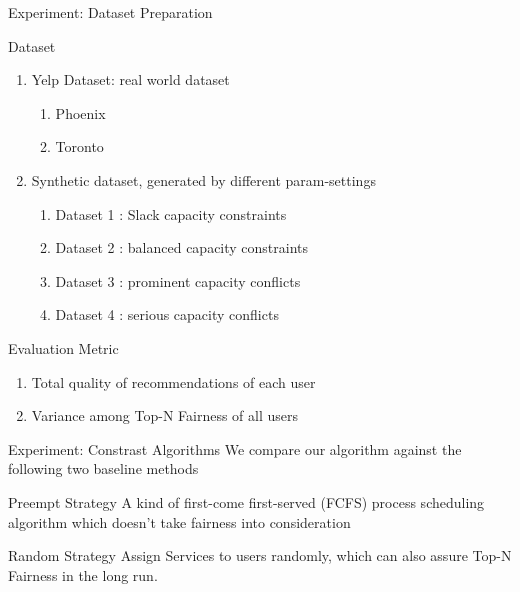 
\begin{frame}{Experiment: Dataset Preparation}
    \begin{block}{Dataset}
    \begin{enumerate}
        \item Yelp Dataset: real world dataset
        \begin{enumerate}
        \item Phoenix
        \item Toronto
        \end{enumerate}
        
        \item Synthetic dataset, generated by different param-settings
        \begin{enumerate}
        \item Dataset 1 : Slack capacity constraints 
        \item Dataset 2 : balanced capacity constraints
        \item Dataset 3 : prominent capacity conflicts 
        \item Dataset 4 : serious capacity conflicts
        \end{enumerate}
        
    \end{enumerate}
    \end{block}
    \begin{block}{Evaluation Metric}

         \begin{enumerate}
        \item Total quality of recommendations of each user
        \item Variance among Top-N Fairness of all users
        \end{enumerate}

    
        \end{block}
    
\end{frame}





\begin{frame}{Experiment: Constrast Algorithms}
    We compare our algorithm against the following two baseline methods
    
    \begin{block}{Preempt Strategy}
A kind of first-come first-served (FCFS) process scheduling algorithm which doesn’t take fairness into consideration
    
        \end{block}
        \begin{block}{Random Strategy}
Assign Services to users randomly, which can also assure Top-N Fairness in the long run.
        \end{block}
    
\end{frame}




